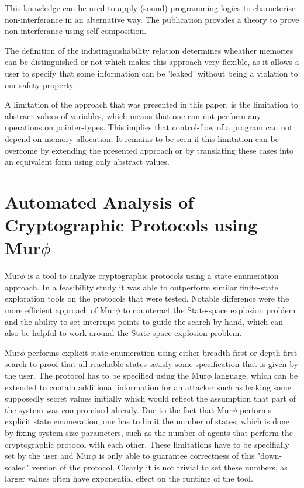 \documentclass[a4paper,UKenglish]{lipics-v2018}
\def\murphi{Mur$\phi$ }
\begin{document}
This knowledge can be used to apply (sound) programming logics to characterise non-interferance in an alternative way. The publication provides a theory to prove non-interferance using self-composition.

The definition of the indistinguishability relation determines wheather memories can be distinguished or not which makes this approach very flexible, as it allows a user to specify that some information can be 'leaked' without being a violation to our safety property.\cite{information_flow_by_self_composition}

A limitation of the approach that was presented in this paper, is the limitation to abstract values of variables\cite{information_flow_by_self_composition}, which means that one can not perform any operations on pointer-types. This implies that control-flow of a program can not depend on memory allocation. It remains to be seen if this limitation can be overcome by extending the presented approach or by translating these cases into an equivalent form using only abstract values.










\newpage
\section{Automated Analysis of Cryptographic Protocols using \murphi}

\murphi is a tool to analyze cryptographic protocols using a state enumeration approach. In a feasibility study it was able to outperform similar finite-state exploration tools on the protocols that were tested. Notable difference were the more efficient approach of \murphi to counteract the State-space explosion problem and the ability to set interrupt points to guide the search by hand, which can also be helpful to work around the State-space explosion problem.\cite{murphi}

\murphi performs explicit state enumeration using either breadth-first or depth-first search to proof that all reachable states satisfy some specification that is given by the user. The protocol has to be specified using the \murphi language, which can be extended to contain additional information for an attacker such as leaking some supposedly secret values initially which would reflect the assumption that part of the system was compromised already. Due to the fact that \murphi performs explicit state enumeration, one has to limit the number of states, which is done by fixing system size parameters, such as the number of agents that perform the cryptographic protocol with each other. These limitations have to be specifially set by the user and \murphi is only able to guarantee correctness of this "down-scaled" version of the protocol. Clearly it is not trivial to set these numbers, as larger values often have exponential effect on the runtime of the tool.\cite{murphi}
\end{document}
